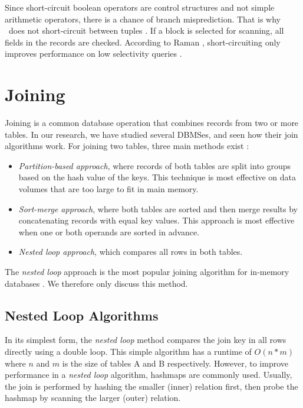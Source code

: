 Since short-circuit boolean operators are control structures and not simple arithmetic operators, there is a chance of branch misprediction. That is why \blink~does not short-circuit between tuples \cite{Raman2008-gi, Johnson2008-cp}. If a block is selected for scanning, all fields in the records are checked. According to Raman \ea, short-circuiting only improves performance on low selectivity queries \cite{Raman2008-gi}.


\section{Joining}
\label{sec:Joining}
Joining is a common database operation that combines records from two or more tables. In our research, we have studied several DBMSes, and seen how their join algorithms work. For joining two tables, three main methods exist \cite{Bratbergsengen2015-ed}: 
\begin{itemize}
  \item \textit{Partition-based approach}, where records of both tables are split into groups based on the hash value of the keys. This technique is most effective on data volumes that are too large to fit in main memory.
  \item \textit{Sort-merge approach}, where both tables are sorted and then merge results by concatenating records with equal key values. This approach is most effective when one or both operands are sorted in advance.
  \item \textit{Nested loop approach}, which compares all rows in both tables.
\end{itemize}

The \textit{nested loop} approach is the most popular joining algorithm for in-memory databases \cite{Boncz2002-yj}. We therefore only discuss this method.

\subsection{Nested Loop Algorithms}
\label{sub:Nested Loop Algorithms}

In its simplest form, the \textit{nested loop} method compares the join key in all rows directly using a double loop. This simple algorithm has a runtime of $O(n*m)$ where $n$ and $m$ is the size of tables A and B respectively. However, to improve performance in a \textit{nested loop} algorithm, hashmaps are commonly used. Usually, the join is performed by hashing the smaller (inner) relation first, then probe the hashmap by scanning the larger (outer) relation. 

